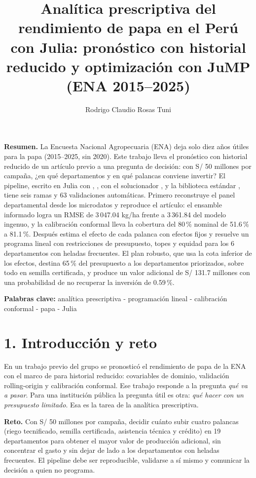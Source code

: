 \documentclass[letterpaper]{report}
\renewcommand{\abstract}[1]{\setstretch{1}\noindent\small\textbf{Resumen.} #1}
\providecommand{\keywords}[1]{\par\smallskip\noindent\small\textbf{Palabras clave:} #1\par}
\begin{document}
\begin{article}
\title{Analítica prescriptiva del rendimiento de papa en el Perú con Julia: pronóstico con historial reducido y optimización con JuMP (ENA 2015--2025)}
\author{Rodrigo Claudio Rosas Tuni}
\maketitle
\abstract{La Encuesta Nacional Agropecuaria (ENA) deja solo diez años útiles para la papa (2015--2025, sin 2020). Este trabajo lleva el pronóstico con historial reducido de un artículo previo a una pregunta de decisión: con S/ 50 millones por campaña, ¿en qué departamentos y en qué palancas conviene invertir? El pipeline, escrito en Julia con \pkg{DataFrames.jl}, \pkg{XGBoost.jl}, \pkg{JuMP} con el solucionador \pkg{HiGHS}, \pkg{Plots.jl} y la biblioteca estándar \pkg{Test}, tiene seis ramas y 63 validaciones automáticas. Primero reconstruye el panel departamental desde los microdatos y reproduce el artículo: el ensamble informado logra un RMSE de 3\,047.04 kg/ha frente a 3\,361.84 del modelo ingenuo, y la calibración conformal lleva la cobertura del 80\,\% nominal de 51.6\,\% a 81.1\,\%. Después estima el efecto de cada palanca con efectos fijos y resuelve un programa lineal con restricciones de presupuesto, topes y equidad para los 6 departamentos con heladas frecuentes. El plan robusto, que usa la cota inferior de los efectos, destina 65\,\% del presupuesto a los departamentos priorizados, sobre todo en semilla certificada, y produce un valor adicional de S/ 131.7 millones con una probabilidad de no recuperar la inversión de 0.59\,\%.}
\keywords{analítica prescriptiva - programación lineal - calibración conformal - papa - Julia}

\section{1. Introducción y reto}
En un trabajo previo del grupo \citep{articulo} se pronosticó el rendimiento de papa de la ENA \citep{inei} con el marco de \citet{huang} para historial reducido: covariables de dominio, validación rolling-origin y calibración conformal. Ese trabajo responde a la pregunta \emph{qué va a pasar}. Para una institución pública la pregunta útil es otra: \emph{qué hacer con un presupuesto limitado}. Esa es la tarea de la analítica prescriptiva.

\textbf{Reto.} Con S/ 50 millones por campaña, decidir cuánto subir cuatro palancas (riego tecnificado, semilla certificada, asistencia técnica y crédito) en 19 departamentos para obtener el mayor valor de producción adicional, sin concentrar el gasto y sin dejar de lado a los departamentos con heladas frecuentes. El pipeline debe ser reproducible, validarse a sí mismo y comunicar la decisión a quien no programa.


\end{article}
\end{document}
